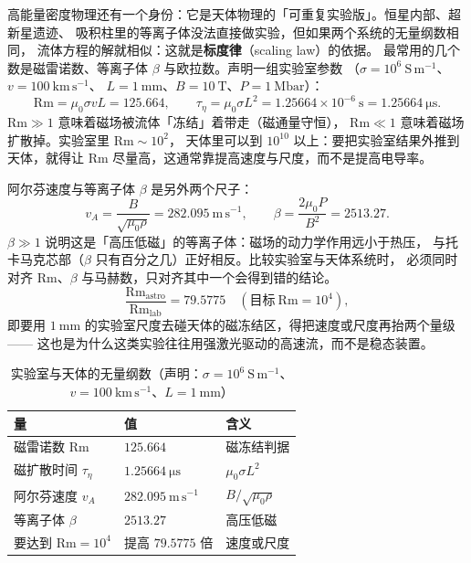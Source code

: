 高能量密度物理还有一个身份：它是天体物理的「可重复实验版」。恒星内部、超新星遗迹、
吸积柱里的等离子体没法直接做实验，但如果两个系统的无量纲数相同，
流体方程的解就相似：这就是\textbf{标度律}（scaling law）的依据。
最常用的几个数是磁雷诺数、等离子体 $\beta$ 与欧拉数。声明一组实验室参数
（$\sigma=10^{6}\ \mathrm{S\,m^{-1}}$、$v=100\ \mathrm{km\,s^{-1}}$、
$L=1\ \mathrm{mm}$、$B=10\ \mathrm{T}$、$P=1\ \mathrm{Mbar}$）：
\begin{equation}
\mathrm{Rm}=\mu_0\sigma vL=125.664,
\qquad
\tau_\eta=\mu_0\sigma L^2=1.25664\times10^{-6}\ \mathrm{s}=1.25664\ \mathrm{\mu s}.
\label{eq:app-aw-rm}
\end{equation}
$\mathrm{Rm}\gg1$ 意味着磁场被流体「冻结」着带走（磁通量守恒），
$\mathrm{Rm}\ll1$ 意味着磁场扩散掉。实验室里 $\mathrm{Rm}\sim10^{2}$，
天体里可以到 $10^{10}$ 以上：要把实验室结果外推到天体，就得让 $\mathrm{Rm}$
尽量高，这通常靠提高速度与尺度，而不是提高电导率。

阿尔芬速度与等离子体 $\beta$ 是另外两个尺子：
\begin{equation}
v_A=\frac{B}{\sqrt{\mu_0\rho}}=282.095\ \mathrm{m\,s^{-1}},
\qquad
\beta=\frac{2\mu_0P}{B^2}=2513.27.
\label{eq:app-aw-va}
\end{equation}
$\beta\gg1$ 说明这是「高压低磁」的等离子体：磁场的动力学作用远小于热压，
与托卡马克芯部（$\beta$ 只有百分之几）正好相反。比较实验室与天体系统时，
必须同时对齐 $\mathrm{Rm}$、$\beta$ 与马赫数，只对齐其中一个会得到错的结论。
\begin{equation}
\frac{\mathrm{Rm}_\mathrm{astro}}{\mathrm{Rm}_\mathrm{lab}}
=79.5775\quad(\text{目标}\ \mathrm{Rm}=10^{4}),
\label{eq:app-aw-similarity}
\end{equation}
即要用 $1\ \mathrm{mm}$ 的实验室尺度去碰天体的磁冻结区，得把速度或尺度再抬两个量级——
这也是为什么这类实验往往用强激光驱动的高速流，而不是稳态装置。

\begin{table}[htbp]
\centering
\small
\caption{实验室与天体的无量纲数（声明：$\sigma=10^{6}\ \mathrm{S\,m^{-1}}$、$v=100\ \mathrm{km\,s^{-1}}$、$L=1\ \mathrm{mm}$）}
\label{tab:app-aw-astro}
\begin{tabular}{p{4.6cm}p{4.2cm}p{4.0cm}}
\hline
量 & 值 & 含义 \\
\hline
磁雷诺数 $\mathrm{Rm}$ & $125.664$ & 磁冻结判据 \\
磁扩散时间 $\tau_\eta$ & $1.25664\ \mathrm{\mu s}$ & $\mu_0\sigma L^2$ \\
阿尔芬速度 $v_A$ & $282.095\ \mathrm{m\,s^{-1}}$ & $B/\sqrt{\mu_0\rho}$ \\
等离子体 $\beta$ & $2513.27$ & 高压低磁 \\
要达到 $\mathrm{Rm}=10^{4}$ & 提高 $79.5775$ 倍 & 速度或尺度 \\
\hline
\end{tabular}
\end{table}

